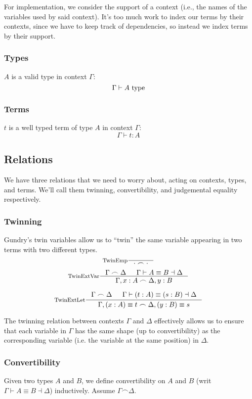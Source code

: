 For implementation, we consider the support of a context (i.e., the names of the variables used by said context).
It's too much work to index our terms by their contexts, since we have to keep track of dependencies, so instead we index terms by their support.

\subsubsection{Types}
$A$ is a valid type in context $\Gamma$:
\[
  \Gamma \vdash A \textrm{ type}
\]

\subsubsection{Terms}
$t$ is a well typed term of type $A$ in context $\Gamma$:
\[
  \Gamma \vdash t : A
\]

\subsection{Relations}
We have three relations that we need to worry about, acting on contexts, types, and terms. We'll call them twinning, convertibility, and judgemental equality respectively.

\subsubsection{Twinning}
Gundry's twin variables \cite{gundry2013TypeInferenceHaskell} \cite{gundry2013TutorialImplementationDynamic} allow us to ``twin'' the same variable appearing in two terms with two different types.
\[
  \inference[TwinEmp]{}{\cdot \frown \cdot}
\]
\[
  \inference[TwinExtVar]
    { \Gamma \frown \Delta
    & \Gamma \vdash A \equiv B \dashv \Delta
    }
    { \Gamma, x : A \frown \Delta, y : B }
\]

\[
  \inference[TwinExtLet]
  { \twin{\Gamma}{\Delta}
  & \Gamma \vdash (t : A) \equiv (s : B) \dashv \Delta
  }
  {\twin{\Gamma, (x : A) \equiv t}{\Delta, (y : B) \equiv s}}
\]

The twinning relation between contexts $\Gamma$ and $\Delta$ effectively allows us to ensure that each variable in $\Gamma$ has the same shape (up to convertibility) as the corresponding variable (i.e. the variable at the same position) in $\Delta$.

\subsubsection{Convertibility}
Given two types $A$ and $B$, we define convertibility on $A$ and $B$ (writ $\Gamma \vdash A \equiv B \dashv \Delta$) inductively. Assume $\Gamma \frown \Delta$.


